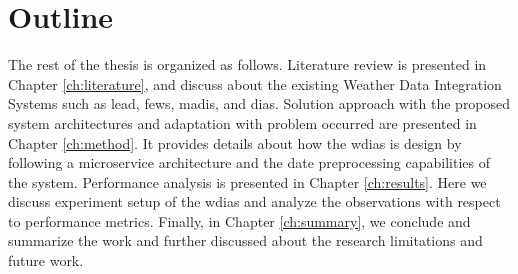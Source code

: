 \section{Outline}
The rest of the thesis is organized as follows. Literature review is presented in Chapter \ref{ch:literature}, and discuss about the existing Weather Data Integration Systems such as \acrshort{lead}, \acrshort{fews}, \acrshort{madis}, and \acrshort{dias}. Solution approach with the proposed system architectures and adaptation with problem occurred are presented in Chapter \ref{ch:method}. It provides details about how the \acrshort{wdias} is design by following a microservice architecture and the date preprocessing capabilities of the system. Performance analysis is presented in Chapter \ref{ch:results}. Here we discuss experiment setup of the \acrshort{wdias} and analyze the observations with respect to performance metrics. Finally, in Chapter \ref{ch:summary}, we conclude and summarize the work and further discussed about the research limitations and future work.

